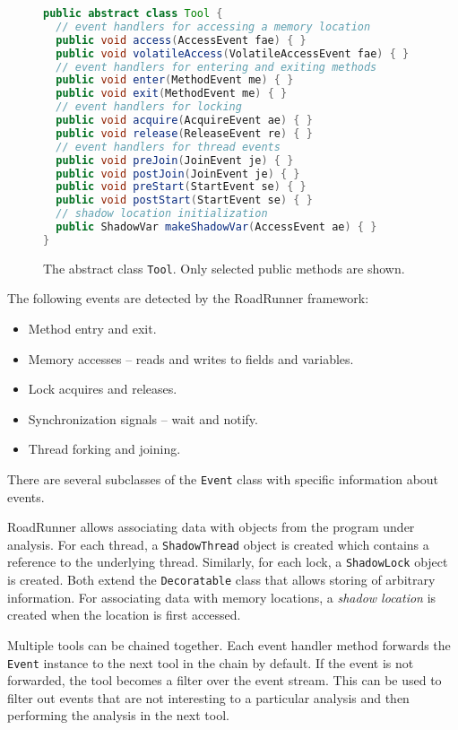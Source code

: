 \begin{figure}[hbt]
    \label{toolclass}
    \begin{lstlisting}[language=java]
public abstract class Tool {
  // event handlers for accessing a memory location
  public void access(AccessEvent fae) { }
  public void volatileAccess(VolatileAccessEvent fae) { }
  // event handlers for entering and exiting methods
  public void enter(MethodEvent me) { }
  public void exit(MethodEvent me) { }
  // event handlers for locking
  public void acquire(AcquireEvent ae) { }
  public void release(ReleaseEvent re) { }
  // event handlers for thread events
  public void preJoin(JoinEvent je) { }
  public void postJoin(JoinEvent je) { }
  public void preStart(StartEvent se) { }
  public void postStart(StartEvent se) { }
  // shadow location initialization
  public ShadowVar makeShadowVar(AccessEvent ae) { }
}
    \end{lstlisting}
    \caption{The abstract class \texttt{Tool}. Only selected public methods are
    shown.}
\end{figure}

The following events are detected by the RoadRunner framework:
\begin{itemize}
    \item Method entry and exit.
    \item Memory accesses -- reads and writes to fields and variables.
    \item Lock acquires and releases.
    \item Synchronization signals -- wait and notify.
    \item Thread forking and joining.
\end{itemize}

There are several subclasses of the \texttt{Event} class with specific
information about events.

RoadRunner allows associating data with objects from the program under analysis.
For each thread, a \texttt{ShadowThread} object is created which contains a
reference to the underlying thread. Similarly, for each lock, a
\texttt{ShadowLock} object is created. Both extend the \texttt{Decoratable}
class that allows storing of arbitrary information. For associating data with
memory locations, a \emph{shadow location} is created when the location is first
accessed.

Multiple tools can be chained together. Each event handler method forwards the
\texttt{Event} instance to the next tool in the chain by default. If the event
is not forwarded, the tool becomes a filter over the event stream. This can be
used to filter out events that are not interesting to a particular analysis and
then performing the analysis in the next tool.

